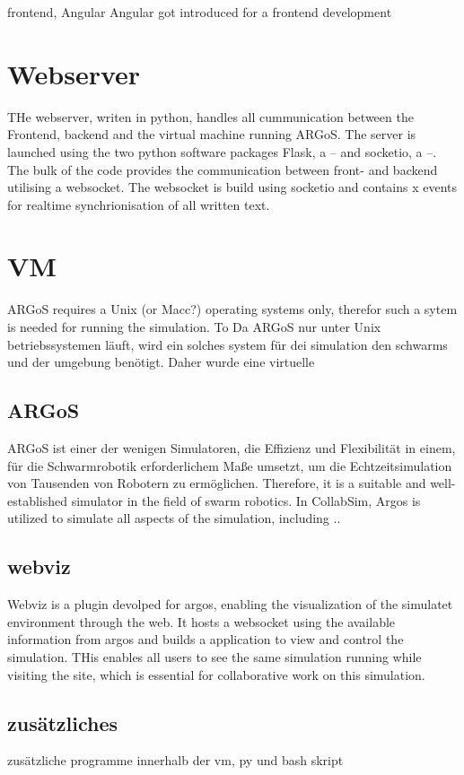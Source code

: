 \documentclass[german,version-2020-11]{uzl-thesis}
\begin{document}
frontend, Angular
Angular got introduced for a frontend development

\section{Webserver}
THe webserver, writen in python, handles all cummunication between the Frontend, backend and the virtual machine running ARGoS. 
The server is launched using the two python software packages Flask, a -- and socketio, a --.
The bulk of the code provides the communication between front- and backend utilising a websocket. 
The websocket is build using socketio and contains x events for realtime synchrionisation of all written text.

\section{VM}
ARGoS requires a Unix (or Macc?) operating systems only, therefor such a sytem is needed for running the simulation. To 
Da ARGoS nur unter Unix betriebssystemen läuft, wird ein solches system für dei simulation den schwarms und der umgebung benötigt. Daher wurde eine virtuelle
\subsection{ARGoS}
  ARGoS ist einer der wenigen Simulatoren, die Effizienz und Flexibilität in einem, für die Schwarmrobotik erforderlichem Maße umsetzt, 
  um die Echtzeitsimulation von Tausenden von Robotern zu ermöglichen.
 Therefore, it is a suitable and well-established simulator in the field of swarm robotics.
  In CollabSim, Argos is utilized to simulate all aspects of the simulation, including ..
  \subsection{webviz}
  Webviz is a plugin devolped for argos, enabling the visualization of the simulatet environment through the web. 
  It hosts a websocket using the available information from argos and builds a application to view and control the simulation. 
  THis enables all users to see the same simulation running while visiting the site, which is essential for collaborative work on this simulation.

  \subsection{zusätzliches}
  zusätzliche programme innerhalb der vm, py und bash skript
\end{document}

